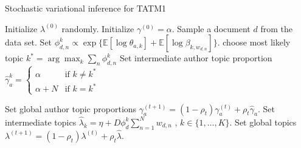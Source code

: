 \begin{algorithm}[tb]
\caption{Stochastic variational inference for TATM1}
\label{alg:stoch_tatm1}
\begin{algorithmic}[1]
	\STATE Initialize $\lambda^{(0)}$ randomly.
	\STATE Initialize $\gamma^{(0)} = \alpha$.
	\REPEAT
		\STATE Sample a document $d$ from the data set.
			\STATE Set $\phi^k_{d,n} \propto \exp \{ \mathbb{E}[\log \theta_{a,k}] + \mathbb{E}[\log \beta_{k,w_{d,n}}] \}$.
		\ENDFOR
		\STATE choose most likely topic $k^*=\arg\max_k \sum_n \phi^k_{d,n}$
		\STATE Set intermediate author topic proportion $\hat{\gamma}^k_a = 
			\left\lbrace \begin{array}{ll}
			\alpha & \textrm{if }k\neq k^* \\
			\alpha + N & \textrm{if }k=k^*
			\end{array}   \right. $
		
		\STATE Set global author topic proportions $\gamma_a^{(t+1)} = (1 - \rho_t) \gamma_a^{(t)} + \rho_t \hat{\gamma}_a$.
		\STATE Set intermediate topics $\hat{\lambda}_k = \eta +D \phi_d^k \sum_{n=1}^{N}{w_{d,n}}$ , $k\in\{1,\dots,K\}$.
		\STATE Set global topics $\lambda^{(t+1)} = (1 - \rho_t) \lambda^{(t)} + \rho_t \hat{\lambda}$.
\end{algorithmic}
\end{algorithm}